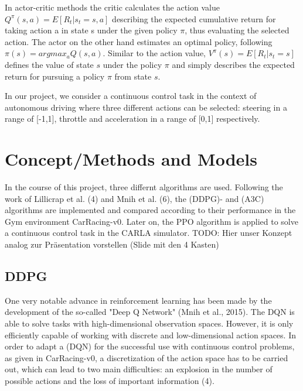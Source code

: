 \documentclass[letterpaper, 10 pt, conference]{ieeeconf}  %
\begin{document}
In actor-critic methods the critic calculates the action value $Q^\pi(s,a) = E[R_t|s_t=s,a]$ describing the expected cumulative return for taking action a in state s under the given policy $\pi$, thus evaluating the selected action. The actor on the other hand estimates an optimal policy, following $\pi(s) = argmax_aQ(s,a)$. Similar to the action value, $V^\pi(s) = E[R_t|s_t=s]$ defines the value of state $s$ under the policy $\pi$ and simply describes the expected return for pursuing a policy $\pi$ from state $s$.

In our project, we consider a continuous control task in the context of autonomous driving where three different actions can be selected: steering in a range of [-1,1], throttle  and acceleration in a range of [0,1] respectively.

\section{Concept/Methods and Models}

In the course of this project, three differnt algorithms are used. Following the work of Lillicrap et al. (4) and Mnih et al. (6), the (DDPG)- and (A3C) algorithms are implemented and compared according to their performance in the Gym environment CarRacing-v0. Later on, the PPO algorithm is applied to solve a continuous control task in the CARLA simulator.
TODO: Hier unser Konzept analog zur Präsentation vorstellen (Slide mit den 4 Kasten)

\subsection{DDPG}
One very notable advance in reinforcement learning has been made by the development of the so-called "Deep Q Network" (Mnih et al., 2015). The DQN is able to solve tasks with high-dimensional observation spaces. However, it is only efficiently capable of working with discrete and low-dimensional action spaces. In order to adapt a (DQN) for the successful use with continuous control problems, as given in CarRacing-v0, a discretization of the action space has to be carried out, which can lead to two main difficulties: an explosion in the number of possible actions and the loss of important information (4).
\end{document}
